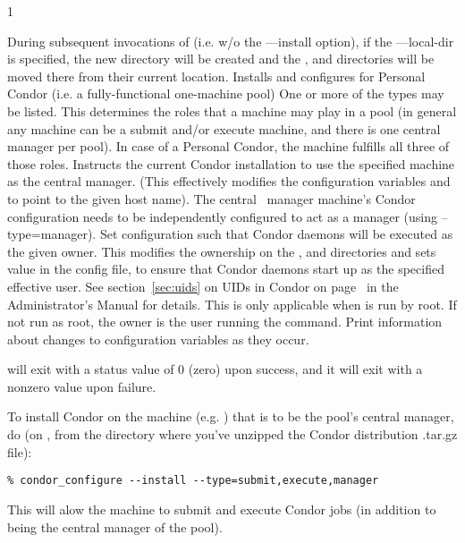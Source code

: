 \begin{ManPage}{\label{man-condor-configure}}{1}
\begin{Options}
{	During subsequent invocations of  (i.e. w/o the 
	---install option), if the ---local-dir is specified, the new directory
	will be created and the ,  and  
	directories will be moved there from their current location.}
	 {Installs and configures for 
	  Personal Condor (i.e. a fully-functional one-machine pool)}
	 {One
	or more of the types may be listed.
	This determines the roles that a machine may play in a pool (in general any
	machine can be a submit and/or execute machine, and there is one central manager
	per pool). In case of a Personal Condor, the machine fulfills all three of those
	roles.}
	 {Instructs the current
	Condor installation to use the specified machine as the central manager. 
	(This effectively modifies the configuration variables 
	and  to point to the given host name). The central \
	manager machine's Condor configuration needs to be independently configured to 
	act as a manager (using --type=manager). }
	 {Set configuration
	such that Condor daemons will be executed as the given owner. This modifies the 
	ownership on the \File{log}, \File{spool} and \File{execute} directories and sets
	\MacroNI{CONDOR\_IDS} value in the config file, to ensure that Condor daemons start up as the specified effective user. See section~\ref{sec:uids} on
UIDs in Condor on page~\pageref{sec:uids} in the Administrator's
Manual for details.
	This is only applicable when  is run by root.
	If not run as root, the owner is the user running the  
	command.
	}
	 {Print information about changes
	to configuration variables as they occur.}
\end{Options}

\ExitStatus

 will exit with a status value of 0 (zero) upon success,
and it will exit with a nonzero value upon failure.

\Examples
To install Condor on the machine  (e.g. ) that is to be the pool's central manager, do (on , from the directory where you've unzipped the Condor distribution .tar.gz file):
\begin{verbatim}
% condor_configure --install --type=submit,execute,manager
\end{verbatim}
This will alow the machine to submit and execute Condor jobs (in addition to being the central manager of the pool).



\end{ManPage}
